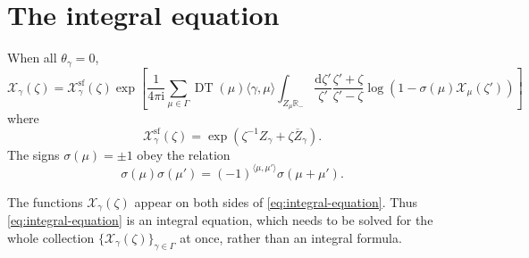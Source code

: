 \documentclass[12pt,letterpaper,reqno]{article}
\numberwithin{equation}{section}
\newcommand{\cX}{\ensuremath{\mathcal X}}
\newcommand{\bbR}{\ensuremath{\mathbb R}}
\newcommand{\I}{{\mathrm i}}
\newcommand{\de}{\mathrm{d}}
\renewcommand{\sf}{\mathrm{sf}}
\newcommand{\IP}[1]{\langle#1\rangle}
\DeclareMathOperator{\DT}{DT}
\begin{document}
\section{The integral equation} \label{sec:integral-equations}

\begin{conj}[Integral equation for $\theta_\gamma = 0$] \label{conj:integral-equation}
When all $\theta_\gamma = 0$,
\begin{equation} \label{eq:integral-equation}
  \cX_\gamma(\zeta) = \cX_\gamma^\sf(\zeta) \exp \left[ \frac{1}{4\pi \I} \sum_{\mu \in \Gamma} \DT(\mu) \IP{\gamma,\mu} \int_{Z_\mu \bbR_-} \frac{\de \zeta'}{\zeta'} \frac{\zeta' + \zeta}{\zeta'-\zeta} \log(1 - \sigma(\mu) \cX_\mu(\zeta')) \right]
\end{equation}
where 
\begin{equation}
  \cX_\gamma^\sf(\zeta) = \exp \left( \zeta^{-1} Z_\gamma + \zeta \overline{Z}_\gamma \right).
\end{equation}
The signs $\sigma(\mu) = \pm 1$ obey the relation
\begin{equation}
  \sigma(\mu) \sigma(\mu') = (-1)^{\IP{\mu,\mu'}} \sigma(\mu + \mu').
\end{equation}
\end{conj}

The functions $\cX_\gamma(\zeta)$ appear on both sides of
\eqref{eq:integral-equation}. Thus \eqref{eq:integral-equation} is an integral equation, which needs to be solved for 
the whole collection $\{\cX_\gamma(\zeta)\}_{\gamma \in \Gamma}$
at once, rather than an integral formula.
\end{document}
